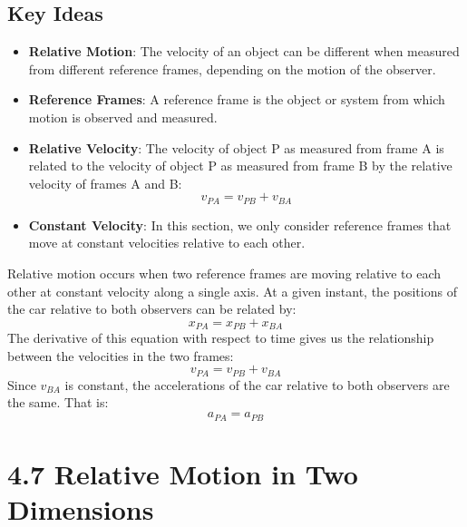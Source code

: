 \documentclass{article}
\begin{document}
\subsection*{Key Ideas}
\begin{itemize}
    \item \textbf{Relative Motion}: The velocity of an object can be different when measured from different reference frames, depending on the motion of the observer.
    \item \textbf{Reference Frames}: A reference frame is the object or system from which motion is observed and measured.
    \item \textbf{Relative Velocity}: The velocity of object P as measured from frame A is related to the velocity of object P as measured from frame B by the relative velocity of frames A and B:
    \[
    v_{PA} = v_{PB} + v_{BA}
    \]
    \item \textbf{Constant Velocity}: In this section, we only consider reference frames that move at constant velocities relative to each other.
\end{itemize}
Relative motion occurs when two reference frames are moving relative to each other at constant velocity along a single axis. At a given instant, the positions of the car relative to both observers can be related by:
\[
x_{PA} = x_{PB} + x_{BA}
\]
The derivative of this equation with respect to time gives us the relationship between the velocities in the two frames:
\[
v_{PA} = v_{PB} + v_{BA}
\]
Since $v_{BA}$ is constant, the accelerations of the car relative to both observers are the same. That is:
\[
a_{PA} = a_{PB}
\]

\section*{4.7 Relative Motion in Two Dimensions}
\end{document}
